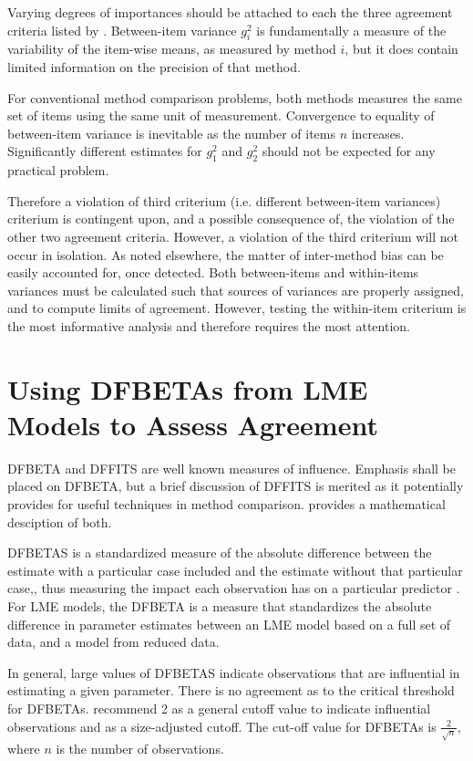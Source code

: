 \documentclass[12pt, a4paper]{report}
\theoremstyle{definition}
\theoremstyle{remark}
\begin{document}
Varying degrees of importances should be attached to each the three agreement criteria listed by \citet{Barnhart}. Between-item variance $g^2_i$ is fundamentally a measure of the variability of the item-wise means, as measured by method $i$, but it does contain limited information on the precision of that method. 

For conventional method comparison problems, both methods measures the same set of items using the same unit of measurement. Convergence to equality of between-item variance is inevitable as the number of items $n$ increases. Significantly different estimates for $g^2_1$ and $g^2_2$ should not be expected for any practical problem. 

Therefore a violation of third criterium (i.e. different between-item variances) criterium is contingent upon, and a  
possible consequence of, the violation of the other two agreement criteria. However, a violation of the third criterium will not occur in isolation. As noted elsewhere, the matter of inter-method bias can be easily accounted for, once detected. Both between-items and within-items variances must be calculated such that sources of variances are properly assigned, and to compute limits of agreement. However, testing the within-item criterium is the most informative analysis and therefore requires the most attention. 





	

\section{Using DFBETAs from LME Models to Assess Agreement}


DFBETA and DFFITS are well known measures of influence. Emphasis shall be placed on DFBETA, but a brief discussion of DFFITS is merited as it potentially provides for useful techniques in method comparison. \citet{schabenberger} provides a mathematical desciption of both.

DFBETAS is a standardized measure of the absolute difference between the estimate with a particular
case included and the estimate without that particular case,, thus measuring the impact each observation has on a particular predictor \citep{belsley2005}. For LME models, the DFBETA is a measure that standardizes the absolute difference in parameter estimates between an LME model based on a full set of data, and a model from reduced data.

In general, large values of DFBETAS indicate observations that are influential in estimating a given parameter. There is no agreement as to the critical threshold for DFBETAs. \citet{belsley2005} recommend 2 as a general cutoff value to indicate influential observations and as a size-adjusted cutoff.  The cut-off value for DFBETAs is $\frac{2}{\sqrt{n}}$, where $n$ is the number of observations. 
\end{document}
